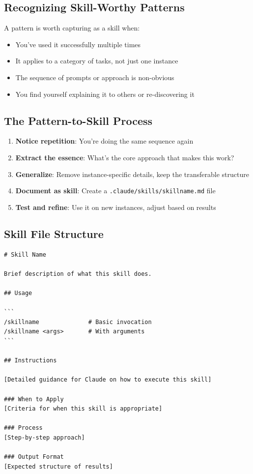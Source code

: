 \subsection{Recognizing Skill-Worthy Patterns}

A pattern is worth capturing as a skill when:
\begin{itemize}
    \item You've used it successfully multiple times
    \item It applies to a category of tasks, not just one instance
    \item The sequence of prompts or approach is non-obvious
    \item You find yourself explaining it to others or re-discovering it
\end{itemize}

\subsection{The Pattern-to-Skill Process}

\begin{enumerate}
    \item \textbf{Notice repetition}: You're doing the same sequence again
    \item \textbf{Extract the essence}: What's the core approach that makes this work?
    \item \textbf{Generalize}: Remove instance-specific details, keep the transferable structure
    \item \textbf{Document as skill}: Create a \texttt{.claude/skills/skillname.md} file
    \item \textbf{Test and refine}: Use it on new instances, adjust based on results
\end{enumerate}

\subsection{Skill File Structure}

\begin{lstlisting}
# Skill Name

Brief description of what this skill does.

## Usage

```
/skillname              # Basic invocation
/skillname <args>       # With arguments
```

## Instructions

[Detailed guidance for Claude on how to execute this skill]

### When to Apply
[Criteria for when this skill is appropriate]

### Process
[Step-by-step approach]

### Output Format
[Expected structure of results]
\end{lstlisting}

